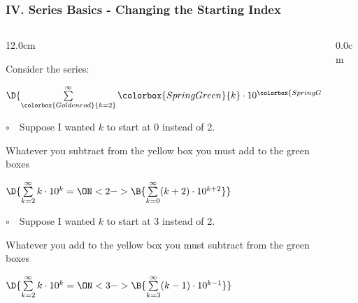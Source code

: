 \begin{frame}
\frametitle{IV. Series Basics - Changing the Starting Index}
\scriptsize
\begin{columns}
\begin{column}{12.0cm}

Consider the series:

\begin{center}
	$\D{\sum \limits_{\colorbox{Goldenrod}{k = 2}}^{\infty} \colorbox{SpringGreen}{k} \cdot 10^{\colorbox{SpringGreen}{k}}}$ \\
\end{center}

$\circ$ \,\, Suppose I wanted $k$ to start at 0 instead of 2. \\

\vspace{0.2cm}

\hspace{0.3cm} Whatever you subtract from the yellow box you must add to the green boxes \\

\begin{center}
	$\D{\sum \limits_{k = 2}^{\infty} k \cdot 10^{k} = \ON<2->{\B{ \sum \limits_{k = 0}^{\infty} (k+2) \cdot 10^{k+2}}}}$
\end{center}

$\circ$ \,\, Suppose I wanted $k$ to start at 3 instead of 2. \\

\vspace{0.2cm}

\hspace{0.3cm} Whatever you add to the yellow box you must subtract from the green boxes \\

\begin{center}
	$\D{\sum \limits_{k = 2}^{\infty} k \cdot 10^{k} = \ON<3->{\B{ \sum \limits_{k = 3}^{\infty} (k-1) \cdot 10^{k-1}}}}$
\end{center}

\vspace{0.2cm}

\end{column}
\begin{column}{0.0cm}\end{column}
\end{columns}
\end{frame}

